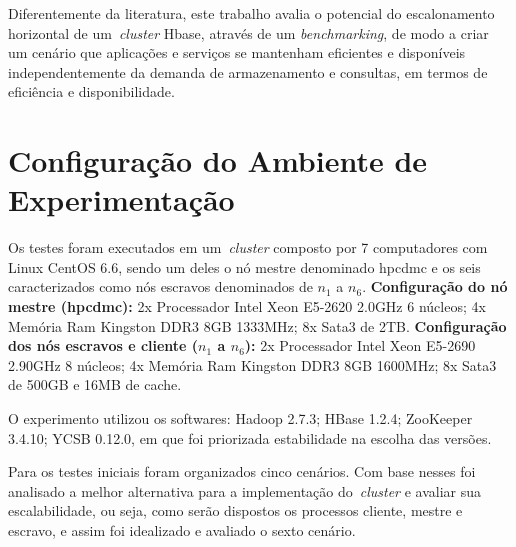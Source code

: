 \documentclass[12pt]{article}
\begin{document}
Diferentemente da literatura, este trabalho avalia o potencial do escalonamento horizontal de um~\emph{cluster} Hbase, através de um \textit{benchmarking}, de modo a criar um cenário que aplicações e serviços se mantenham eficientes e disponíveis independentemente da demanda de armazenamento e consultas, em termos de eficiência e disponibilidade.

\section{Configuração do Ambiente de Experimentação}
\label{sec:conf-experimento}

Os testes foram executados em um~\emph{cluster} composto por 7 computadores com Linux CentOS 6.6, sendo um deles o nó mestre denominado hpcdmc e os seis caracterizados como nós escravos denominados de $n_1$ a $n_6$. \textbf{Configuração do nó mestre (hpcdmc):} 2x Processador Intel Xeon E5-2620 2.0GHz 6 núcleos; 4x Memória Ram Kingston DDR3 8GB 1333MHz; 8x Sata3 de 2TB. \textbf{Configuração dos nós escravos e cliente ($n_1$ a $n_6$):} 2x Processador Intel Xeon E5-2690 2.90GHz 8 núcleos; 4x Memória Ram Kingston DDR3 8GB 1600MHz; 8x Sata3 de 500GB e 16MB de cache.

O experimento utilizou os softwares: Hadoop 2.7.3; HBase 1.2.4; ZooKeeper 3.4.10; YCSB 0.12.0, em que foi priorizada estabilidade na escolha das versões.

Para os testes iniciais foram organizados cinco cenários. 
Com base nesses foi analisado a melhor alternativa para a implementação do~\emph{cluster} e avaliar sua escalabilidade, ou seja, como serão dispostos os processos cliente, mestre e escravo, e assim foi idealizado e avaliado o sexto cenário.
\end{document}
